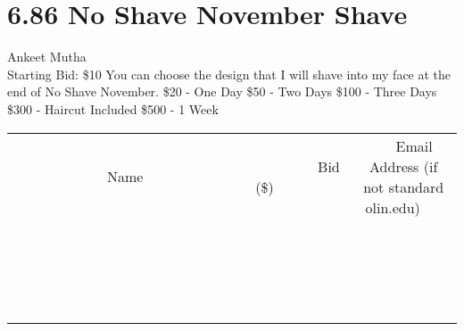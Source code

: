\documentclass[11pt]{article}
\begin{document}
\section*{6.86 No Shave November Shave}
Ankeet Mutha
\\
Starting Bid: \$10
\newline
You can choose the design that I will shave into my face at the end of No Shave November. 
\$20 - One Day
\$50 - Two Days
\$100 - Three Days
\$300 - Haircut Included
\$500 - 1 Week
\\[3ex]
\begin{tabular}{c c c}
~~~~~~~~~~~~~Name~~~~~~~~~~~~~ & ~~~~~~~~~Bid (\$)~~~~~~~~~  & ~~~Email Address (if not standard olin.edu)~~~\\
 & & \\
\hline
 & & \\
\hline
 & & \\
\hline
 & & \\
\hline
 & & \\
\hline
 & & \\
\hline
 & & \\
\hline
 & & \\
\hline
 & & \\
\hline
 & & \\
\hline
 & & \\
\hline
 & & \\
\hline
 & & \\
\hline
 & & \\
\hline
 & & \\
\hline
 & & \\
\hline
 & & \\
\hline
 & & \\
\hline
 & & \\
\hline
\end{tabular}
\newpage
\end{document}
